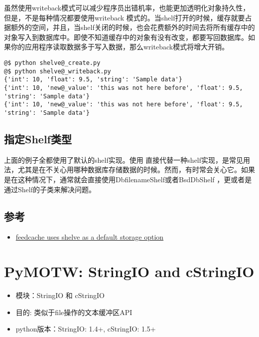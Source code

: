 \documentclass[letterpaper,10pt,english]{manual}
\begin{document}
虽然使用writeback模式可以减少程序员出错机率，也能更加透明化对象持久性，但是，不是每种情况都要使用writeback 模式的。当shelf打开的时候，缓存就要占据额外的空间，并且，当shelf关闭的时候，也会花费额外的时间去将所有缓存中的对象写入到数据库中。即使不知道缓存中的对象有没有改变，都要写回数据库。如果你的应用程序读取数据多于写入数据，那么writeback模式将增大开销。

\begin{Verbatim}[commandchars=@\[\]]
@$ python shelve@_create.py
@$ python shelve@_writeback.py
{'int': 10, 'float': 9.5, 'string': 'Sample data'}
{'int': 10, 'new@_value': 'this was not here before', 'float': 9.5, 'string': 'Sample data'}
{'int': 10, 'new@_value': 'this was not here before', 'float': 9.5, 'string': 'Sample data'}
\end{Verbatim}


\subsection{指定Shelf类型}

上面的例子全都使用了默认的shelf实现。使用  直接代替一种shelf实现，是常见用法，尤其是在不关心用哪种数据库存储数据的时候。然而，有时常会关心它。如果是在这种情况下，通常就会直接使用DbfilenameShelf或者BsdDbShelf ，更或者是通过Shelf的子类来解决问题。


\subsection{参考}
\begin{itemize}
\item {} 
\href{http://www.doughellmann.com/projects/feedcache/}{feedcache uses shelve as a default storage option}

\end{itemize}

\resetcurrentobjects


\section{PyMOTW: StringIO and cStringIO}
\begin{itemize}
\item {} 
模块：StringIO 和 cStringIO

\item {} 
目的: 类似于file操作的文本缓冲区API

\item {} 
python版本：StringIO: 1.4+, cStringIO: 1.5+

\end{itemize}
\end{document}
